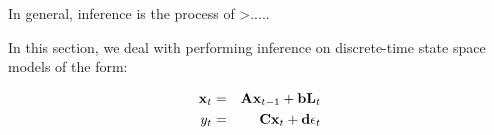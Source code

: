 \documentclass[../main.tex]{subfiles}
\begin{document}
In general, inference is the process of >.....

In this section, we deal with performing inference on discrete-time state space models of the form: 

\begin{eqnarray}
    \mathbf{x}_t & = & \mathbf{A}\mathbf{x}_{t-1} + \mathbf{b}\mathbf{L}_t \notag \\
    y_t & = & \mathbf{C}\mathbf{x}_t + \mathbf{d}\mathbf{\epsilon}_t \notag
\end{eqnarray}
\end{document}
